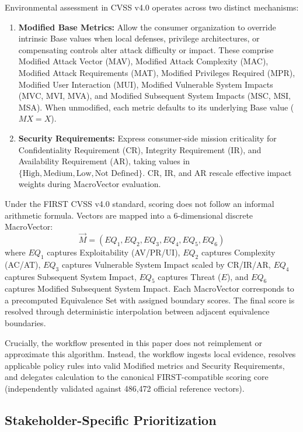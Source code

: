 \documentclass[conference]{IEEEtran}
\begin{document}
Environmental assessment in CVSS v4.0 operates across two distinct mechanisms:
\begin{enumerate}
\item \textbf{Modified Base Metrics:} Allow the consumer organization to override intrinsic Base values when local defenses, privilege architectures, or compensating controls alter attack difficulty or impact. These comprise Modified Attack Vector (MAV), Modified Attack Complexity (MAC), Modified Attack Requirements (MAT), Modified Privileges Required (MPR), Modified User Interaction (MUI), Modified Vulnerable System Impacts (MVC, MVI, MVA), and Modified Subsequent System Impacts (MSC, MSI, MSA). When unmodified, each metric defaults to its underlying Base value ($MX = X$).
\item \textbf{Security Requirements:} Express consumer-side mission criticality for Confidentiality Requirement (CR), Integrity Requirement (IR), and Availability Requirement (AR), taking values in $\{\text{High}, \text{Medium}, \text{Low}, \text{Not Defined}\}$. CR, IR, and AR rescale effective impact weights during MacroVector evaluation.
\end{enumerate}

Under the FIRST CVSS v4.0 standard, scoring does not follow an informal arithmetic formula. Vectors are mapped into a 6-dimensional discrete MacroVector:
\begin{equation}
\vec{M} = (EQ_1, EQ_2, EQ_3, EQ_4, EQ_5, EQ_6)
\end{equation}
where $EQ_1$ captures Exploitability (AV/PR/UI), $EQ_2$ captures Complexity (AC/AT), $EQ_3$ captures Vulnerable System Impact scaled by CR/IR/AR, $EQ_4$ captures Subsequent System Impact, $EQ_5$ captures Threat ($E$), and $EQ_6$ captures Modified Subsequent System Impact. Each MacroVector corresponds to a precomputed Equivalence Set with assigned boundary scores. The final score is resolved through deterministic interpolation between adjacent equivalence boundaries.

Crucially, the workflow presented in this paper does not reimplement or approximate this algorithm. Instead, the workflow ingests local evidence, resolves applicable policy rules into valid Modified metrics and Security Requirements, and delegates calculation to the canonical FIRST-compatible scoring core (independently validated against 486,472 official reference vectors).

\subsection{Stakeholder-Specific Prioritization}
\end{document}
